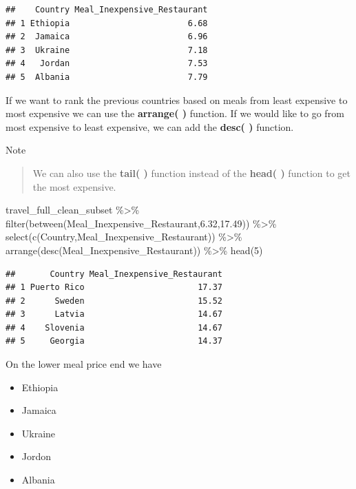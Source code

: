 \documentclass[
]{book}
\newenvironment{Shaded}{\begin{snugshade}}{\end{snugshade}}
\newcommand{\DecValTok}[1]{\textcolor[rgb]{0.00,0.00,0.81}{#1}}
\newcommand{\FloatTok}[1]{\textcolor[rgb]{0.00,0.00,0.81}{#1}}
\newcommand{\FunctionTok}[1]{\textcolor[rgb]{0.00,0.00,0.00}{#1}}
\newcommand{\NormalTok}[1]{#1}
\newcommand{\SpecialCharTok}[1]{\textcolor[rgb]{0.00,0.00,0.00}{#1}}
\begin{document}
\begin{verbatim}
##    Country Meal_Inexpensive_Restaurant
## 1 Ethiopia                        6.68
## 2  Jamaica                        6.96
## 3  Ukraine                        7.18
## 4   Jordan                        7.53
## 5  Albania                        7.79
\end{verbatim}

If we want to rank the previous countries based on meals from least expensive to most expensive we can use the \textbf{arrange( )} function. If we would like to go from most expensive to least expensive, we can add the \textbf{desc( )} function.

Note

\begin{quote}
We can also use the \textbf{tail( )} function instead of the \textbf{head( )} function to get the most expensive.
\end{quote}

\begin{Shaded}
\begin{Highlighting}[]
\NormalTok{travel\_full\_clean\_subset }\SpecialCharTok{\%\textgreater{}\%}
  \FunctionTok{filter}\NormalTok{(}\FunctionTok{between}\NormalTok{(Meal\_Inexpensive\_Restaurant,}\FloatTok{6.32}\NormalTok{,}\FloatTok{17.49}\NormalTok{)) }\SpecialCharTok{\%\textgreater{}\%}
  \FunctionTok{select}\NormalTok{(}\FunctionTok{c}\NormalTok{(Country,Meal\_Inexpensive\_Restaurant)) }\SpecialCharTok{\%\textgreater{}\%}
  \FunctionTok{arrange}\NormalTok{(}\FunctionTok{desc}\NormalTok{(Meal\_Inexpensive\_Restaurant)) }\SpecialCharTok{\%\textgreater{}\%}
  \FunctionTok{head}\NormalTok{(}\DecValTok{5}\NormalTok{)}
\end{Highlighting}
\end{Shaded}

\begin{verbatim}
##       Country Meal_Inexpensive_Restaurant
## 1 Puerto Rico                       17.37
## 2      Sweden                       15.52
## 3      Latvia                       14.67
## 4    Slovenia                       14.67
## 5     Georgia                       14.37
\end{verbatim}

On the lower meal price end we have

\begin{itemize}
\item
  Ethiopia
\item
  Jamaica
\item
  Ukraine
\item
  Jordon
\item
  Albania
\end{itemize}
\end{document}
